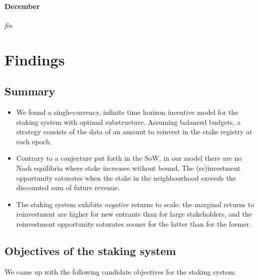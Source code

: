 \paragraph{December} \emph{fin}

\newpage
\section*{Findings}


\subsection*{Summary}

\begin{itemize}
  \item We found a single-currency, infinite time horizon incentive model for the staking system with optimal substructure.
  Assuming balanced budgets, a strategy consists of the data of an amount to reinvest in the stake registry at each epoch.

  \item Contrary to a conjecture put forth in the SoW, in our model there are no Nash equilibria where stake increases without bound.
  The (re)investment opportunity saturates when the stake in the neighbourhood exceeds the discounted sum of future revenue.
  \item The staking system exhibits \emph{negative} returns to scale: the marginal returns to reinvestment are higher for new entrants than for large stakeholders, and the reinvestment opportunity saturates sooner for the latter than for the former.
\end{itemize}

\subsection*{Objectives of the staking system}

We came up with the following candidate objectives for the staking system:

